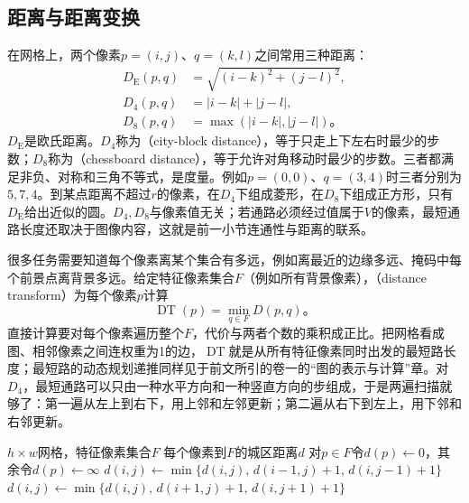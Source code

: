 \subsection{距离与距离变换}
\label{sec:vision-formation-distance}

在网格上，两个像素$p=(i,j)$、$q=(k,l)$之间常用三种距离：
\begin{equation}
  \begin{aligned}
    D_{\mathrm E}(p,q)&=\sqrt{(i-k)^2+(j-l)^2},\\
    D_4(p,q)&=\lvert i-k\rvert+\lvert j-l\rvert,\\
    D_8(p,q)&=\max(\lvert i-k\rvert,\lvert j-l\rvert)\text{。}
  \end{aligned}
  \label{eq:vision-formation-grid-distances}
\end{equation}
$D_{\mathrm E}$是欧氏距离。$D_4$称为（city-block distance），等于只走上下左右时最少的步数；$D_8$称为（chessboard distance），等于允许对角移动时最少的步数。三者都满足非负、对称和三角不等式，是度量。例如$p=(0,0)$、$q=(3,4)$时三者分别为$5,7,4$。到某点距离不超过$r$的像素，在$D_4$下组成菱形，在$D_8$下组成正方形，只有$D_{\mathrm E}$给出近似的圆。$D_4,D_8$与像素值无关；若通路必须经过值属于$V$的像素，最短通路长度还取决于图像内容，这就是前一小节连通性与距离的联系。

很多任务需要知道每个像素离某个集合有多远，例如离最近的边缘多远、掩码中每个前景点离背景多远。给定特征像素集合$F$（例如所有背景像素），（distance transform）为每个像素$p$计算
\[
  \operatorname{DT}(p)=\min_{q\in F}D(p,q)\text{。}
\]
直接计算要对每个像素遍历整个$F$，代价与两者个数的乘积成正比。把网格看成图、相邻像素之间连权重为1的边，$\operatorname{DT}$就是从所有特征像素同时出发的最短路长度；最短路的动态规划递推同样见于前文所引的卷一的“图的表示与计算”章。对$D_4$，最短通路可以只由一种水平方向和一种竖直方向的步组成，于是两遍扫描就够了：第一遍从左上到右下，用上邻和左邻更新；第二遍从右下到左上，用下邻和右邻更新。

\begin{algorithm}[两遍扫描的城区距离变换]
  \label{alg:vision-formation-distance-transform}
  \begin{algorithmic}[1]
    \Require $h\times w$网格，特征像素集合$F$
    \Ensure 每个像素到$F$的城区距离$d$
    \State 对$p\in F$令$d(p)\gets0$，其余令$d(p)\gets\infty$
      \State $d(i,j)\gets\min\{d(i,j),\,d(i-1,j)+1,\,d(i,j-1)+1\}$
    \EndFor
      \State $d(i,j)\gets\min\{d(i,j),\,d(i+1,j)+1,\,d(i,j+1)+1\}$
    \EndFor
  \end{algorithmic}
\end{algorithm}

